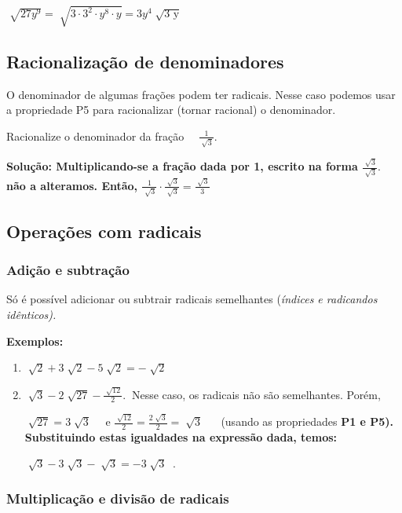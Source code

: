 \quad  \( \sqrt[]{27y^{9}}=\sqrt[]{3  \cdot 3^{2} \cdot y^{8} \cdot y}=3y^{4}\sqrt[]{\text{3 y}} \) ~ \qedsymbol{}

\subsection{Racionalização de denominadores}

O denominador de algumas frações podem ter radicais. Nesse caso podemos usar a propriedade P5 para racionalizar (tornar racional) o denominador. 

\begin{texemplo}
	
Racionalize o denominador da fração~~   \( \frac{1}{\sqrt[]{3}}. \)

\textbf{Solução: Multiplicando-se a fração dada por 1, escrito na forma  \( \frac{\sqrt[]{3}}{\sqrt[]{3}}. \) ~~ não a alteramos. Então,  \( \frac{1}{\sqrt[]{3}} \cdot \frac{\sqrt[]{3}}{\sqrt[]{3}}=\frac{\sqrt[]{3}}{3} \) ~ \qedsymbol{}}
\end{texemplo}
\subsection{Operações com radicais}

\subsubsection{Adição e subtração}

Só é possível adicionar ou subtrair radicais semelhantes (\textit{índices e radicandos idênticos). }

\textbf{Exemplos:}

\begin{enumerate}
	\item  \( \sqrt[]{2}+3\sqrt[]{2}-5\sqrt[]{2}=-\sqrt[]{2} \) 

	\item  \( \sqrt[]{3}-2\sqrt[]{27}-\frac{\sqrt[]{12}}{2}.~ \)  Nesse caso, os radicais não são semelhantes. Porém,

 \( \sqrt[]{27}=3\sqrt[]{3} \) ~~e   \( \frac{\sqrt[]{12}}{2}=\frac{2\sqrt[]{3}}{2}=\sqrt[]{3} \) ~~ (usando as propriedades \textbf{P1 e P5). Substituindo estas igualdades na expressão dada, temos:}

 \( \sqrt[]{3}-3\sqrt[]{3}-\sqrt[]{3}=-3\sqrt[]{3}~ \) .
\end{enumerate}
	\subsubsection{Multiplicação e divisão de radicais}


